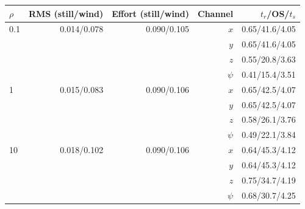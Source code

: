 \begin{tabular}{lrrrr}\toprule
$\rho$ & RMS (still/wind) & Effort (still/wind) & Channel & $t_r$/OS/$t_s$ \\\midrule
0.1 & 0.014/0.078 & 0.090/0.105 & $x$ & 0.65/41.6/4.05 \\
 & & & $y$ & 0.65/41.6/4.05 \\
 & & & $z$ & 0.55/20.8/3.63 \\
 & & & $\psi$ & 0.41/15.4/3.51 \\
1 & 0.015/0.083 & 0.090/0.106 & $x$ & 0.65/42.5/4.07 \\
 & & & $y$ & 0.65/42.5/4.07 \\
 & & & $z$ & 0.58/26.1/3.76 \\
 & & & $\psi$ & 0.49/22.1/3.84 \\
10 & 0.018/0.102 & 0.090/0.106 & $x$ & 0.64/45.3/4.12 \\
 & & & $y$ & 0.64/45.3/4.12 \\
 & & & $z$ & 0.75/34.7/4.19 \\
 & & & $\psi$ & 0.68/30.7/4.25 \\
\bottomrule\end{tabular}
